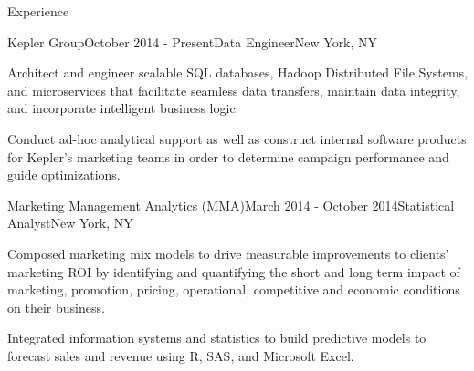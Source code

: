 \documentclass{resume} %
\begin{document}
\begin{rSection}{Experience}

\begin{rSubsection}{Kepler Group}{October 2014 - Present}{Data Engineer}{New York, NY}
\item Architect and engineer scalable SQL databases, Hadoop Distributed File Systems, and microservices that facilitate seamless data transfers, maintain data integrity, and incorporate intelligent business logic.
\item Conduct ad-hoc analytical support as well as construct internal software products for Kepler's marketing teams in order to determine campaign performance and guide optimizations.
\end{rSubsection}


\begin{rSubsection}{Marketing Management Analytics (MMA)}{March 2014 - October 2014}{Statistical Analyst}{New York, NY}
\item Composed marketing mix models to drive measurable improvements to clients' marketing ROI by identifying and quantifying the short and long term impact of marketing, promotion, pricing, operational, competitive and economic conditions on their business.
\item Integrated information systems and statistics to build predictive models to forecast sales and revenue using R, SAS, and Microsoft Excel.
\end{rSubsection}


\end{rSection}
\end{document}
